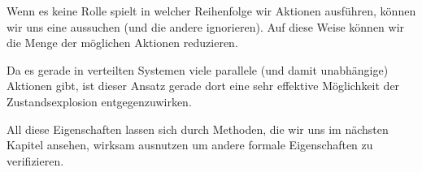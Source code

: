 Wenn es keine Rolle spielt in welcher Reihenfolge wir Aktionen ausführen, können wir uns eine aussuchen (und die andere ignorieren).
Auf diese Weise können wir die Menge der möglichen Aktionen reduzieren.

Da es gerade in verteilten Systemen viele parallele (und damit unabhängige) Aktionen gibt, ist dieser Ansatz gerade dort eine sehr effektive Möglichkeit der Zustandsexplosion entgegenzuwirken.

All diese Eigenschaften lassen sich durch Methoden, die wir uns im nächsten Kapitel ansehen, wirksam ausnutzen um andere formale Eigenschaften zu verifizieren.